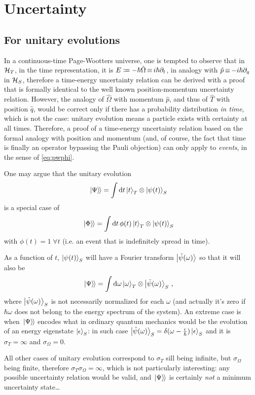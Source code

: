 \section{Uncertainty}

\subsection{For unitary evolutions}

In a continuous-time Page-Wootters universe,
one is tempted to observe that in $\mathcal{H}_T$,
in the time representation, it is $E \coloneqq -\hbar\hat{\Omega} \operatorname*{\equiv} i\hbar\partial_{t}$,
in analogy with $\hat{p} \operatorname*{\equiv} -i\hbar\partial_{q}$ in $\mathcal{H}_S$,
therefore a time-energy uncertainty relation can be derived
with a proof that is formally identical to the well known
position-momentum uncertainty relation. However, the analogy of
$\hat{\Omega}$ with momentum $\hat{p}$,
and thus of $\hat{T}$ with position $\hat{q}$,
would be correct only if there has a probability distribution \emph{in time},
which is not the case: unitary evolution means a particle exists with
certainty at all times. Therefore, a proof of a time-energy uncertainty
relation based on the formal analogy with position and momentum
(and, of course, the fact that time is finally an operator bypassing the Pauli objection)
can only apply to \emph{events}, in the sense of \eqref{eq:pwphi}.

One may argue that the unitary evolution
\[
  \left.\left| \Psi \right\rangle\hspace{-0.115em}\right\rangle = \int \dd{t} \ket{t}_T \otimes \ket{\psi(t)}_S
\]
is a special case of
\[
  \left.\left| \Phi \right\rangle\hspace{-0.115em}\right\rangle = \int \dd{t} \phi(t) \ket{t}_T \otimes \ket{\psi(t)}_S
\]
with $\phi(t)=1 \; \forall t$ (i.e. an event that is indefinitely spread in time).

As a function of $t$, $\ket{\psi(t)}_S$ will have a Fourier transform
$\ket{\tilde{\psi}(\omega)}$
so that it will also be
\[
  \left.\left| \Psi \right\rangle\hspace{-0.115em}\right\rangle = \int \dd \omega \ket{\omega}_T \otimes \ket{\tilde{\psi}(\omega)}_S \, \text{,}
\]
where $\ket{\tilde{\psi}(\omega)}_S$ is not necessarily normalized for each $\omega$
(and actually it's zero if $\hbar\omega$ does not belong to the energy spectrum of the system).
An extreme case is when $\left.\left| \Psi \right\rangle\hspace{-0.115em}\right\rangle$ encodes what in ordinary quantum mechanics would be the evolution
of an energy eigenstate $\ket{\epsilon}_S$: in such case
$\ket{\tilde{\psi}(\omega)}_S = \delta(\omega - \frac{\epsilon}{\hbar})\ket{\epsilon}_S$
and it is $\sigma_{T} = \infty$ and $\sigma_{\Omega} = 0$.

All other cases of unitary evolution correspond to $\sigma_{T}$
sill being infinite, but $\sigma_{\Omega}$ being finite, therefore
$\sigma_{T}\sigma_{\Omega} = \infty$, which is not particularly interesting:
any possible uncertainty relation would be valid, and $\left.\left| \Psi \right\rangle\hspace{-0.115em}\right\rangle$
is certainly \emph{not} a minimum uncertainty state\dots 

